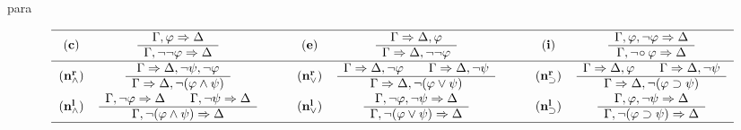 \begin{entry}{para}

\newcommand{\G}{{\bf G}}
\newcommand{\GBK}{{\G_{\bf BK}}}
\newcommand{\name}[1]{{\bf (#1)}}
\newcommand{\vfi}{\varphi}
\newcommand{\su}{\supset}
\newcommand{\ssrul}[2]{\begin{array}{c}#1\\ \hline #2\end{array}}
\newcommand{\ddrul}[3]{\begin{array}{c}#1\hspace{2em}#2\\
\hline #3\end{array}}
\newcommand{\Ga}{\Gamma}
\newcommand{\De}{\Delta}
\newcommand{\Ra}{\Rightarrow}
\newcommand{\srul}[4]{\ssrul{\Ga #1\Ra\De #2}{\Ga
#3\Ra\De #4}}
\newcommand{\drul}[6]{\ddrul{\Ga #1\Ra\De #2}{\Ga #3\Ra\De #4}{\Ga
#5\Ra\De #6}}
\newcommand{\w}{\wedge}

\begin{calculus}

\renewcommand*{\arraystretch}{1.5}
\footnotesize
\[\begin{tabular}{ccc@{\hspace{2em}}ccc@{\hspace{2em}}cc}\hline

${\name{c}}$ &     $\srul{,\vfi}{}{,\neg\neg\vfi}{}$  &&
${\name{e}}$    & $\srul{}{,\vfi}{}{,\neg\neg\vfi}$  &&
${\name{i}}$ &    $\srul{,\vfi,\neg\vfi}{}{,\neg\! \circ \vfi}{}$ \\\hline
${\name{n^r_\w}}$ &
$\srul{}{,\neg\psi,\neg\vfi}{}{,\neg (\vfi\w\psi)}$ &&
${\name{n^r_\vee}}$ &       $\drul{}{,\neg\vfi}{}{,\neg\psi}{}{,\neg(\vfi\vee\psi)}$
&&
${\name{n^r_\su}}$ &   $\drul{}{,\vfi}{}{,\neg\psi}{}{,\neg(\vfi\su\psi)}$
 \\

${\name{n^l_\w}}$ &   $\drul{,\neg \vfi}{}{,\neg \psi}{}{,\neg(\vfi\w\psi)}{}$ &&
${\name{n^l_\vee}}$ & $\srul{,\neg\vfi,\neg\psi}{}{,\neg(\vfi\vee\psi)}{}$ &&
${\name{n^l_\su}}$  &  $\srul{,\vfi,\neg\psi}{}{,\neg(\vfi\su \psi)}{}$  \\\hline


\end{tabular}\]
\end{calculus}
\end{entry}
